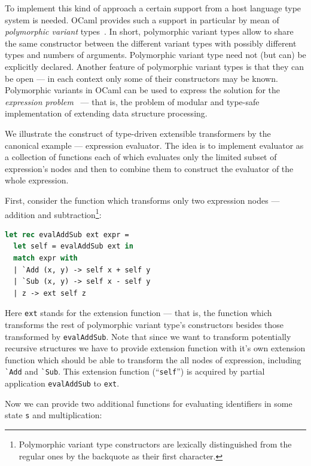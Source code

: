 To implement this kind of approach a certain support from a host language type 
system is needed. OCaml provides such a support in particular by mean of 
\emph{polymorphic variant} types~\cite{PV}. In short, polymorphic variant types allow to 
share the same constructor between the different variant types with possibly different 
types and numbers of arguments. Polymorphic variant type need not (but can) be explicitly
declared. Another feature of polymorphic variant types is that they can be open --- in each
context only some of their constructors may be known. Polymorphic variants in OCaml 
can be used to express the solution for the \emph{expression problem}~\cite{Exproblem, PVReuse} --- 
that is, the problem of modular and type-safe implementation of extending data structure 
processing. 

We illustrate the construct of type-driven extensible transformers by the canonical
example --- expression evaluator. The idea is to implement evaluator as a
collection of functions each of which evaluates only the limited subset of expression's
nodes and then to combine them to construct the evaluator of the whole expression.

First, consider the function which transforms only two expression nodes ---
addition and subtraction\footnote{Polymorphic variant type constructors are lexically distinguished
from the regular ones by the backquote as their first character.}:

\begin{lstlisting}[language=ocaml]
let rec evalAddSub ext expr =
  let self = evalAddSub ext in
  match expr with
  | `Add (x, y) -> self x + self y
  | `Sub (x, y) -> self x - self y
  | z -> ext self z
\end{lstlisting}

Here \lstinline{ext} stands for the extension function --- that is, the function which
transforms the rest of polymorphic variant type's constructors besides those transformed 
by \lstinline{evalAddSub}. Note that since we want to transform potentially recursive 
structures we have to provide extension function with it's own extension function which 
should be able to transform the all nodes of expression, including \lstinline{`Add} and
\lstinline{`Sub}. This extension function (``\lstinline{self}'') is acquired by partial
application \lstinline{evalAddSub} to \lstinline{ext}.

Now we can provide two additional functions for evaluating identifiers in some state 
\lstinline{s} and multiplication:

